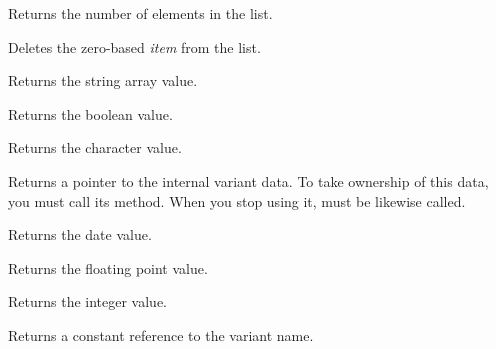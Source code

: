 
Returns the number of elements in the list.

\label{wxvariantdelete}


Deletes the zero-based {\it item} from the list.

\label{wxvariantgetarraystring}


Returns the string array value.

\label{wxvariantgetbool}


Returns the boolean value.

\label{wxvariantgetchar}


Returns the character value.

\label{wxvariantgetdata}


Returns a pointer to the internal variant data. To take ownership
of this data, you must call its 
method. When you stop using it, 
must be likewise called.

\label{wxvariantgetdatetime}


Returns the date value.

\label{wxvariantgetdouble}


Returns the floating point value.

\label{wxvariantgetlong}


Returns the integer value.

\label{wxvariantgetname}


Returns a constant reference to the variant name.


